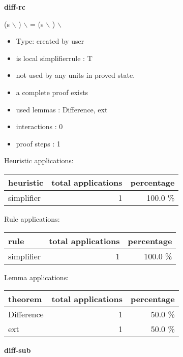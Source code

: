 \documentclass[a4paper]{article}
\begin{document}
{\LARGE\bf diff-rc}\label{lemma-diff-rc}

\medskip

 \Fol (s $\backslash$ ) $\backslash$  = (s $\backslash$ ) $\backslash$ 

\begin{itemize}

\item Type: created by user

\item is local simplifierrule : T
\item not used by any units in proved state.
\item       a complete proof exists
\item       used lemmas  : Difference, ext
\item       interactions : 0
\item       proof steps  : 1
\end{itemize}

\medskip


Heuristic applications:

\begin{supertabular}{l|r|r}
heuristic	& total applications & percentage \\ \hline
simplifier & 1 & 100.0 \% \\

\end{supertabular}

Rule applications:

\begin{supertabular}{l|r|r}
rule	        & total applications & percentage \\ \hline
simplifier & 1 & 100.0 \% \\

\end{supertabular}

Lemma applications:

\begin{supertabular}{l|r|r}
theorem	        & total applications & percentage \\ \hline
Difference & 1 & 50.0 \% \\
ext & 1 & 50.0 \% \\

\end{supertabular}
\pagebreak

{\LARGE\bf diff-sub}\label{lemma-diff-sub}

\medskip
\end{document}
